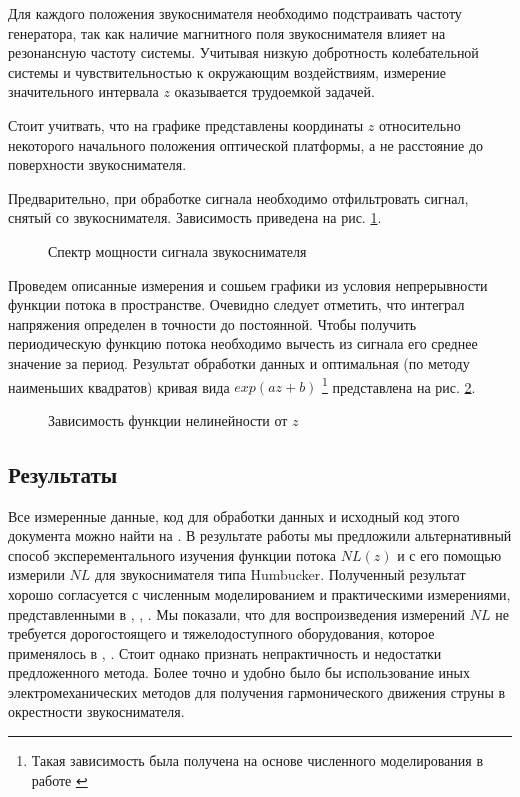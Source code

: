 \documentclass{article}
\begin{document}
Для каждого положения звукоснимателя необходимо подстраивать частоту генератора, так как наличие магнитного поля звукоснимателя
влияет на резонансную частоту системы. Учитывая низкую добротность колебательной системы и чувствительностью к окружающим воздействиям,
измерение значительного интервала $z$ оказывается трудоемкой задачей.

Стоит учитвать, что на графике представлены координаты $z$ относительно некоторого начального положения оптической платформы,
а не расстояние до поверхности звукоснимателя. 

Предварительно, при обработке сигнала необходимо отфильтровать сигнал, снятый со звукоснимателя. Зависимость приведена на
рис. \ref{fig:spectrum}.

\begin{figure}
    \centering
    
    \caption{Спектр мощности сигнала звукоснимателя}
    \label{fig:spectrum}
\end{figure}

Проведем описанные измерения и сошьем графики из условия непрерывности функции потока в пространстве.
Очевидно следует отметить, что интеграл напряжения определен в точности до постоянной. Чтобы получить периодическую функцию потока
необходимо вычесть из сигнала его среднее значение за период.
Результат обработки данных и оптимальная (по методу наименьших квадратов)
кривая вида $exp(a z + b)$
\footnote{Такая зависимость была получена на основе численного моделирования в работе \cite{acoustics-modeling-of-a-pickup}}
представлена на рис. \ref{fig:nl_static_z}.

\begin{figure}
    \centering
    
    \caption{Зависимость функции нелинейности от $z$}
    \label{fig:nl_static_z}
\end{figure}

\subsection{Результаты}

Все измеренные данные, код для обработки данных и исходный код этого документа можно найти на \cite{pickup-lab-repo}. 
В результате работы мы предложили альтернативный способ эксперементального изучения функции потока $NL(z)$
и с его помощью измерили $NL$ для звукоснимателя типа Humbucker. Полученный результат хорошо согласуется с
численным моделированием и практическими измерениями, представленными в \cite{acoustics-modeling-of-a-pickup}, 
\cite{novak:hal-02512148}, \cite{app7010050}. Мы показали, что для воспроизведения измерений $NL$ не требуется
дорогостоящего и тяжелодоступного оборудования, которое применялось в \cite{novak:hal-02512148}, \cite{app7010050}.
Стоит однако признать непрактичность и недостатки предложенного метода. Более точно и удобно было бы использование
иных электромеханических методов для получения гармонического движения струны в окрестности звукоснимателя.
\end{document}
